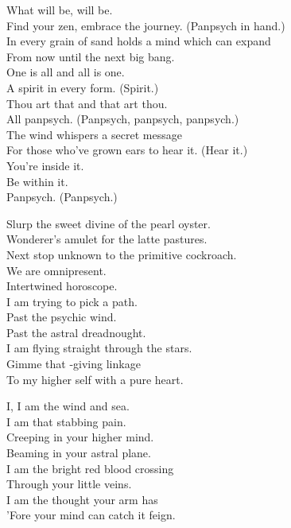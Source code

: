 What will be, will be. \\
Find your zen, embrace the journey. (Panpsych in hand.) \\
In every grain of sand holds a mind which can expand \\
From now until the next big bang. \\

One is all and all is one. \\
A spirit in every form. (Spirit.) \\
Thou art that and that art thou. \\
All panpsych. (Panpsych, panpsych, panpsych.) \\
The wind whispers a secret message \\
For those who've grown ears to hear it. (Hear it.) \\

You're inside it. \\
Be within it. \\
Panpsych. (Panpsych.) \\


Slurp the sweet divine of the pearl oyster. \\
Wonderer's amulet for the latte pastures. \\
Next stop unknown to the primitive cockroach. \\
We are omnipresent. \\
Intertwined horoscope. \\

I am trying to pick a path. \\
Past the psychic wind. \\
Past the astral dreadnought. \\
I am flying straight through the stars. \\
Gimme that -giving linkage \\
To my higher self with a pure heart. \\


I, I am the wind and sea. \\
I am that stabbing pain. \\
Creeping in your higher mind. \\
Beaming in your astral plane. \\
I am the bright red blood crossing \\
Through your little veins. \\
I am the thought your arm has \\
'Fore your mind can catch it feign. \\

